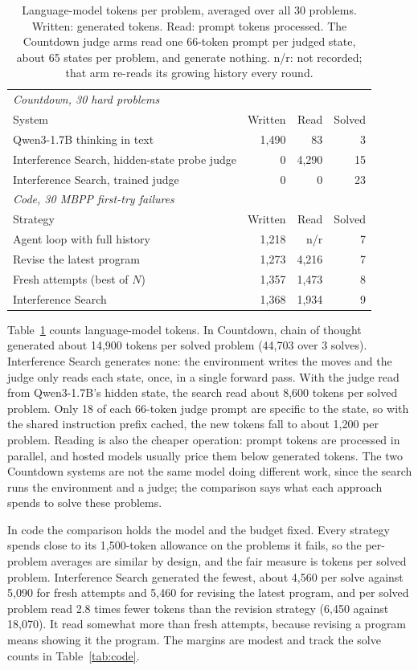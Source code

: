 \documentclass[10pt,twocolumn]{article}
\newcommand{\IS}{Interference Search}
\begin{document}
\begin{table}[t]
\centering\small
\begin{tabularx}{\columnwidth}{Xrrr}
\toprule
\multicolumn{4}{l}{\emph{Countdown, 30 hard problems}} \\
System & Written & Read & Solved \\
\midrule
Qwen3-1.7B thinking in text & 1,490 & 83 & 3 \\
\IS, hidden-state probe judge & 0 & 4,290 & 15 \\
\IS, trained judge & 0 & 0 & 23 \\
\midrule
\multicolumn{4}{l}{\emph{Code, 30 MBPP first-try failures}} \\
Strategy & Written & Read & Solved \\
\midrule
Agent loop with full history & 1,218 & n/r & 7 \\
Revise the latest program & 1,273 & 4,216 & 7 \\
Fresh attempts (best of $N$) & 1,357 & 1,473 & 8 \\
\IS & 1,368 & 1,934 & 9 \\
\bottomrule
\end{tabularx}
\caption{Language-model tokens per problem, averaged over all 30 problems. Written: generated tokens. Read: prompt tokens processed. The Countdown judge arms read one 66-token prompt per judged state, about 65 states per problem, and generate nothing. n/r: not recorded; that arm re-reads its growing history every round.}
\label{tab:tokens}
\end{table}

Table~\ref{tab:tokens} counts language-model tokens. In Countdown, chain of thought generated about 14,900 tokens per solved problem (44,703 over 3 solves). \IS{} generates none: the environment writes the moves and the judge only reads each state, once, in a single forward pass. With the judge read from Qwen3-1.7B's hidden state, the search read about 8,600 tokens per solved problem. Only 18 of each 66-token judge prompt are specific to the state, so with the shared instruction prefix cached, the new tokens fall to about 1,200 per problem. Reading is also the cheaper operation: prompt tokens are processed in parallel, and hosted models usually price them below generated tokens. The two Countdown systems are not the same model doing different work, since the search runs the environment and a judge; the comparison says what each approach spends to solve these problems.

In code the comparison holds the model and the budget fixed. Every strategy spends close to its 1,500-token allowance on the problems it fails, so the per-problem averages are similar by design, and the fair measure is tokens per solved problem. \IS{} generated the fewest, about 4,560 per solve against 5,090 for fresh attempts and 5,460 for revising the latest program, and per solved problem read 2.8 times fewer tokens than the revision strategy (6,450 against 18,070). It read somewhat more than fresh attempts, because revising a program means showing it the program. The margins are modest and track the solve counts in Table~\ref{tab:code}.
\end{document}
